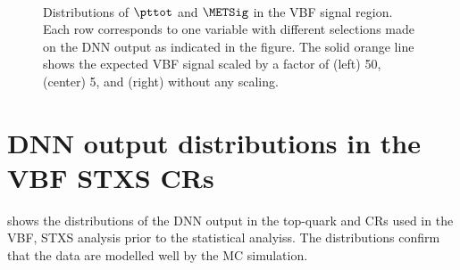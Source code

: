 \begin{figure}[h]
{        } \\
        {\caption[Distributions of $\pttot$ and $\METSig$ in the VBF \TwoJet signal region.]{Distributions of $\pttot$ and $\METSig$ in the VBF \TwoJet signal region.
            Each row corresponds to one variable with different selections made on the DNN output as indicated in the figure. The solid orange line shows the expected VBF signal scaled by a factor of (left) 50, (center) 5, and (right) without any scaling.
            \label{app:fig:dnn-inputs-top-sup} }}
    \end{figure}

    \FloatBarrier
    \section{DNN output distributions in the VBF STXS CRs}
     shows the distributions of the DNN output in the top-quark and \Ztautau CRs used in the VBF, STXS analysis prior to the statistical analyiss.
    The distributions confirm that the data are modelled well by the MC simulation.

